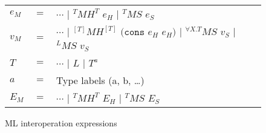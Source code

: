 \begin{figure}[ph!]
\centering
\begin{tabular}{lcl}
\vspace{5pt}

$e_{M}$ & $=$ & $\cdots$ $\vert$ $^{T}MH^{T}$ $e_{H}$ $\vert$ $^{T}MS$ $e_{S}$ \\

\vspace{5pt}

$v_{M}$ & $=$ & $\cdots$ $\vert$ $^{[T]}MH^{[T]}$ $(\mathtt{cons}$ $e_{H}$ $e_{H})$ $\vert$ $^{\forall X.T}MS$ $v_{S}$ $\vert$ $^{L}MS$ $v_{S}$ \\

\vspace{5pt}

$T$ & $=$ & $\cdots$ $\vert$ $L$ $\vert$ $T^{a}$ \\

\vspace{5pt}

$a$ & $=$ & Type labels (a, b, \ldots) \\

\vspace{5pt}

$E_{M}$ & $=$ & $\cdots$ $\vert$ $^{T}MH^{T}$ $E_{H}$ $\vert$ $^{T}MS$ $E_{S}$
\end{tabular}
\caption{ML interoperation expressions}
\label{mie}
\end{figure}